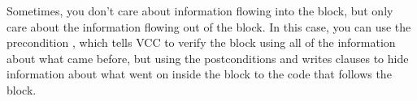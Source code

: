 Sometimes, you don't care about information flowing into the block,
but only care about the information flowing out of the block. In this
case, you can use the precondition ,
which tells VCC to verify the block using all of the information about
what came before, but using the postconditions and writes clauses to
hide information about what went on inside the block to the code that
follows the block.









